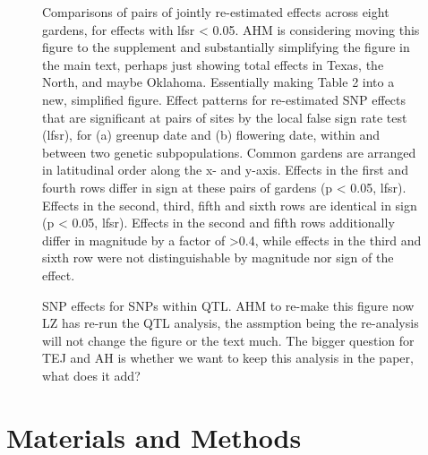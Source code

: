 \documentclass[
  9pt,
  twocolumn,
  twoside]{pnas-new}
\begin{document}
\begin{figure}
\caption{\label{fig-effects}Comparisons of pairs of jointly re-estimated
effects across eight gardens, for effects with lfsr \textless{} 0.05.
AHM is considering moving this figure to the supplement and
substantially simplifying the figure in the main text, perhaps just
showing total effects in Texas, the North, and maybe Oklahoma.
Essentially making Table 2 into a new, simplified figure. Effect
patterns for re-estimated SNP effects that are significant at pairs of
sites by the local false sign rate test (lfsr), for (a) greenup date and
(b) flowering date, within and between two genetic subpopulations.
Common gardens are arranged in latitudinal order along the x- and
y-axis. Effects in the first and fourth rows differ in sign at these
pairs of gardens (p \textless{} 0.05, lfsr). Effects in the second,
third, fifth and sixth rows are identical in sign (p \textless{} 0.05,
lfsr). Effects in the second and fifth rows additionally differ in
magnitude by a factor of \textgreater0.4, while effects in the third and
sixth row were not distinguishable by magnitude nor sign of the effect.}

\end{figure}%

\begin{figure}


\caption{\label{fig-qtl}SNP effects for SNPs within QTL. AHM to re-make
this figure now LZ has re-run the QTL analysis, the assmption being the
re-analysis will not change the figure or the text much. The bigger
question for TEJ and AH is whether we want to keep this analysis in the
paper, what does it add?}

\end{figure}%

\section{Materials and Methods}\label{materials-and-methods}
\end{document}
